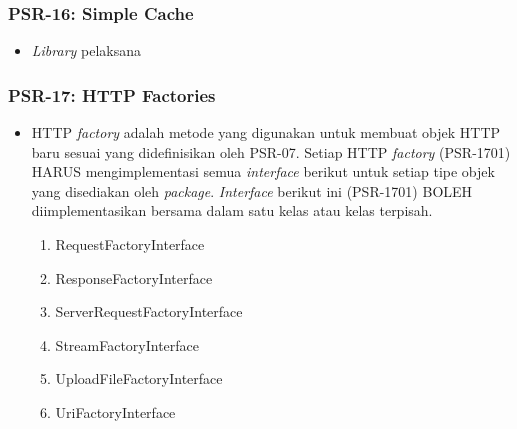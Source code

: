\subsubsection{PSR-16: Simple Cache}
\label{subsubsec:psr16}
\begin{itemize}
	\item \textit{Library} pelaksana 
\end{itemize}

\subsubsection{PSR-17: HTTP Factories}
\label{subsubsec:psr17}
\begin{itemize}
	\item HTTP \textit{factory} adalah metode yang digunakan untuk membuat objek HTTP baru sesuai yang didefinisikan oleh PSR-07. Setiap HTTP \textit{factory} (PSR-1701) HARUS mengimplementasi semua \textit{interface} berikut untuk setiap tipe objek yang disediakan oleh \textit{package}. \textit{Interface} berikut ini (PSR-1701) BOLEH diimplementasikan bersama dalam satu kelas atau kelas terpisah.
	\begin{enumerate}
		\item RequestFactoryInterface
		\item ResponseFactoryInterface
		\item ServerRequestFactoryInterface
		\item StreamFactoryInterface
		\item UploadFileFactoryInterface
		\item UriFactoryInterface
	\end{enumerate} 
\end{itemize}

